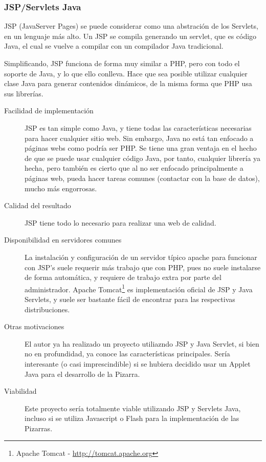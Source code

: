 \subsubsection{JSP/Servlets Java}
JSP (JavaServer Pages) se puede considerar como una abstración de los Servlets, en un lenguaje más alto. Un JSP se compila generando un servlet, que es código Java, el cual se vuelve a compilar con un compilador Java tradicional.

Simplificando, JSP funciona de forma muy similar a PHP, pero con todo el soporte de Java, y lo que ello conlleva. Hace que sea posible utilizar cualquier clase Java para generar contenidos dinámicos, de la misma forma que PHP usa sus librerías.

\begin{description}
	\item[Facilidad de implementación] JSP es tan simple como Java, y tiene todas las características necesarias para hacer cualquier sitio web. Sin embargo, Java no está tan enfocado a páginas webs como podría ser PHP. Se tiene una gran ventaja en el hecho de que se puede usar cualquier código Java, por tanto, cualquier librería ya hecha, pero también es cierto que al no ser enfocado principalmente a páginas web, pueda hacer tareas comunes (contactar con la base de datos), mucho más engorrosas.
	\item[Calidad del resultado] JSP tiene todo lo necesario para realizar una web de calidad.
	\item[Disponibilidad en servidores comunes] La instalación y configuración de un servidor típico apache para funcionar con JSP's suele requerir más trabajo que con PHP, pues no suele instalarse de forma automática, y requiere de trabajo extra por parte del administrador. Apache Tomcat\footnote{Apache Tomcat - \url{http://tomcat.apache.org}} es implementación oficial de JSP y Java Servlets, y suele ser bastante fácil de encontrar para las respectivas distribuciones. 
	\item[Otras motivaciones] El autor ya ha realizado un proyecto utiliazndo JSP y Java Servlet, si bien no en profundidad, ya conoce las características principales. Sería interesante (o casi imprescindible) si se hubiera decidido usar un Applet Java para el desarrollo de la Pizarra.
	\item[Viabilidad] Este proyecto sería totalmente viable utilizando JSP y Servlets Java, incluso si se utiliza Javascript o Flash para la implementación de las Pizarras.
\end{description}

